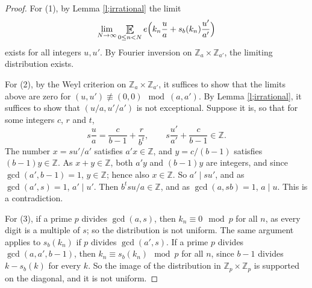 \begin{proof}
For (1), by Lemma \ref{l;irrational} the limit 
\begin{equation}
\lim_{N\to\infty}\Expectation_{0\leq n<N}e\Bigl(k_n\frac ua+s_b(k_n)\frac{u'}{a'}\Bigr)
\end{equation}
exists for all integers $u,u'$. By Fourier inversion on $\mathbb{Z}_a\times\mathbb{Z}_{a'}$, the limiting distribution exists. 

For (2), by the Weyl criterion on $\mathbb{Z}_a\times\mathbb{Z}_{a'}$, it suffices to show that the limits above are zero for $(u,u')\not\equiv(0,0)\mod (a,a')$. 
By Lemma \ref{l;irrational}, it suffices to show that $(u/a,u'/a')$ is not exceptional. 
Suppose it is, so that for some integers $c$, $r$ and $t$, 
\begin{equation}
s\frac ua=\frac{c}{b-1}+\frac{r}{b^t}, \qquad s\frac{u'}{a'}+\frac{c}{b-1}\in\mathbb{Z}. 
\end{equation}
The number $x=su'/a'$ satisfies $a'x\in\mathbb{Z}$, and $y=c/(b-1)$ satisfies $(b-1)y\in\mathbb{Z}$. 
As $x+y\in\mathbb{Z}$, both $a'y$ and $(b-1)y$ are integers, and since $\gcd(a',b-1)=1$, $y\in\mathbb{Z}$; hence also $x\in\mathbb{Z}$. 
So $a'\mid su'$, and as $\gcd(a',s)=1$, $a'\mid u'$. 
Then $b^tsu/a\in\mathbb{Z}$, and as $\gcd(a,sb)=1$, $a\mid u$. This is a contradiction. 

For (3), if a prime $p$ divides $\gcd(a,s)$, then $k_n\equiv 0\mod p$ for all $n$, as every digit is a multiple of $s$; so the distribution is not uniform. 
The same argument applies to $s_b(k_n)$ if $p$ divides $\gcd(a',s)$. 
If a prime $p$ divides $\gcd(a,a',b-1)$, then $k_n\equiv s_b(k_n)\mod p$ for all $n$, since $b-1$ divides $k-s_b(k)$ for every $k$. 
So the image of the distribution in $\mathbb{Z}_p\times\mathbb{Z}_p$ is supported on the diagonal, and it is not uniform. 
\end{proof}

